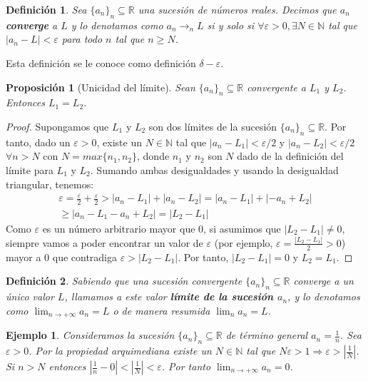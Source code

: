 \documentclass{article}
\newtheorem{prop}{Proposición}
\newtheorem{define}{Definición}
\newtheorem{ejem}{Ejemplo}
\newcommand{\reales}{\mathbb{R}}
\newcommand{\naturales}{\mathbb{N}}
\newcommand{\sucreal}[1]{\{ #1 _n \}_n \subseteq \reales}
\newcommand{\limiten}[1]{\lim_{n \rightarrow +\infty} #1}
\begin{document}
\begin{define}
	Sea $\{ a_n\}_n \subseteq \mathbb{R}$ una sucesión de números reales. Decimos que $a_n$ \textbf{converge} a $L$ y lo denotamos como $a_n \rightarrow_{n} L$ si y solo si 
	$\forall \varepsilon > 0,\exists N \in \mathbb{N}$ tal que $|a_n - L| < \varepsilon$ para todo $n$ tal que $n \geq N$.
\end{define}
Esta definición se le conoce como definición $\delta-\varepsilon$.

\begin{prop}[Unicidad del límite]
	Sean $\{ a_n\}_n \subseteq \mathbb{R}$ convergente a $L_1$ y $L_2$. Entonces $L_1 = L_2$.
\end{prop}
\begin{proof}
	Supongamos que $L_1$ y $L_2$ son dos límites de la sucesión $\{ a_n\}_n \subseteq \mathbb{R}$. Por tanto, dado un $\varepsilon > 0$, existe un $N \in \mathbb{N}$ 
	tal que $|a_n - L_1| < \varepsilon/2$ y $|a_n - L_2| < \varepsilon/2\ $ $\forall n > N$ con $N=max\{n_1, n_2\}$, donde $n_1$ y $n_2$ son $N$ dado de la definición del límite para 
	$L_1$ y $L_2$. Sumando ambas desigualdades y usando la desigualdad triangular, tenemos:
	\begin{align*}
		\varepsilon = \frac{\varepsilon}{2} + \frac{\varepsilon}{2} > |a_n - L_1| + |a_n - L_2| = |a_n - L_1| + |-a_n + L_2| \\ \geq |a_n - L_1 - a_n + L_2| = |L_2 - L_1|
	\end{align*}
	Como $\varepsilon$ es un número arbitrario mayor que 0, si asumimos que $|L_2 - L_1| \neq 0$, siempre vamos a poder encontrar un valor de $\varepsilon$ (por ejemplo, 
	$\varepsilon = \frac{|L_2 - L_1|}{2} > 0$) mayor a 0 que contradiga $\varepsilon > |L_2 - L_1|$. Por tanto, $|L_2 - L_1| = 0$ y $L_2 = L_1$.
\end{proof}


\begin{define}
	Sabiendo que una sucesión convergente $\{ a_n\}_n \subseteq \mathbb{R}$ converge a un único valor $L$, llamamos a este valor \textbf{límite de la sucesión $a_n$}, y lo denotamos como
	$\lim_{n\rightarrow +\infty} a_n = L$ o de manera resumida $\lim_{n} a_n = L$.
\end{define}

\begin{ejem}
	Consideramos la sucesión $\sucreal{a}$ de término general $a_n = \frac{1}{n}$. Sea $\varepsilon > 0 $. Por la propiedad arquimediana existe un $N \in \naturales$ tal que $N\varepsilon > 1 \Rightarrow \varepsilon > |\frac{1}{N}|$. Si $n > N$ entonces $|\frac{1}{n} - 0| < |\frac{1}{N}| < \varepsilon$. Por tanto $\limiten{a_n} = 0$.
\end{ejem}
\end{document}
